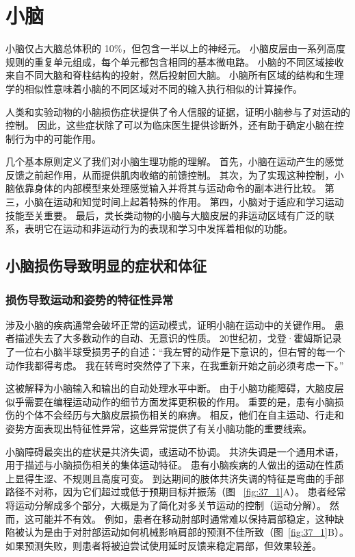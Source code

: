 \chapter{小脑} \label{chap:chap37}

小脑仅占大脑总体积的 10\%，但包含一半以上的神经元。
小脑皮层由一系列高度规则的重复单元组成，每个单元都包含相同的基本微电路。
小脑的不同区域接收来自不同大脑和脊柱结构的投射，然后投射回大脑。
小脑所有区域的结构和生理学的相似性意味着小脑的不同区域对不同的输入执行相似的计算操作。


人类和实验动物的小脑损伤症状提供了令人信服的证据，证明小脑参与了对运动的控制。
因此，这些症状除了可以为临床医生提供诊断外，还有助于确定小脑在控制行为中的可能作用。


几个基本原则定义了我们对小脑生理功能的理解。
首先，小脑在运动产生的感觉反馈之前起作用，从而提供肌肉收缩的前馈控制。
其次，为了实现这种控制，小脑依靠身体的内部模型来处理感觉输入并将其与运动命令的副本进行比较。
第三，小脑在运动和知觉时间上起着特殊的作用。
第四，小脑对于适应和学习运动技能至关重要。
最后，灵长类动物的小脑与大脑皮层的非运动区域有广泛的联系，表明它在运动和非运动行为的表现和学习中发挥着相似的功能。



\section{小脑损伤导致明显的症状和体征}

\subsection{损伤导致运动和姿势的特征性异常}

涉及小脑的疾病通常会破坏正常的运动模式，证明小脑在运动中的关键作用。
患者描述失去了大多数动作的自动、无意识的性质。
20世纪初，戈登·霍姆斯记录了一位右小脑半球受损男子的自述：“我左臂的动作是下意识的，但右臂的每一个动作我都得考虑。
我在转弯时突然停了下来，在我重新开始之前必须考虑一下。”


这被解释为小脑输入和输出的自动处理水平中断。
由于小脑功能障碍，大脑皮层似乎需要在编程运动动作的细节方面发挥更积极的作用。
重要的是，患有小脑损伤的个体不会经历与大脑皮层损伤相关的麻痹。
相反，他们在自主运动、行走和姿势方面表现出特征性异常，这些异常提供了有关小脑功能的重要线索。


小脑障碍最突出的症状是共济失调，或运动不协调。
共济失调是一个通用术语，用于描述与小脑损伤相关的集体运动特征。
患有小脑疾病的人做出的运动在性质上显得生涩、不规则且高度可变。 
到达期间的肢体共济失调的特征是弯曲的手部路径不对称，因为它们超过或低于预期目标并振荡（图 ~\ref{fig:37_1}A）。
患者经常将运动分解成多个部分，大概是为了简化对多关节运动的控制（运动分解）。
然而，这可能并不有效。
例如，患者在移动肘部时通常难以保持肩部稳定，这种缺陷被认为是由于对肘部运动如何机械影响肩部的预测不佳所致（图~\ref{fig:37_1}B）。
如果预测失败，则患者将被迫尝试使用延时反馈来稳定肩部，但效果较差。


